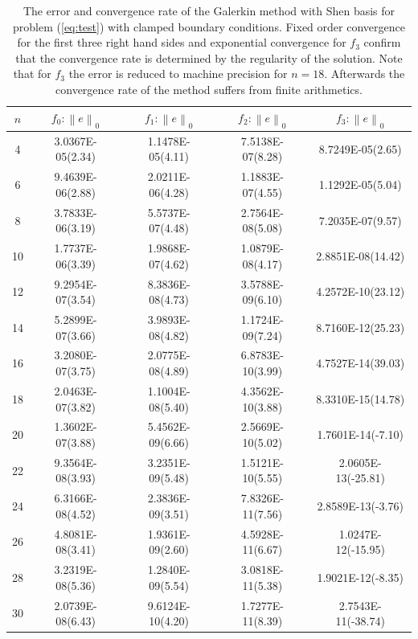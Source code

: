 \documentclass{marine_2015}
\newcommand{\norm}[1]{\ensuremath{\left\|#1\right\|}}
\begin{document}
\begin{table}[t!]
    \begin{center}
    \begin{tabular}{ccccc}
\hline
$n$  &  $f_0: \norm{e}_0$  & $f_1: \norm{e}_0$ & $f_2: \norm{e}_0$ & $f_3: \norm{e}_0$\\
\hline
4 &  3.0367E-05(2.34)& 1.1478E-05(4.11)& 7.5138E-07(8.28)& 8.7249E-05(2.65)  \\ 
6 &  9.4639E-06(2.88)& 2.0211E-06(4.28)& 1.1883E-07(4.55)& 1.1292E-05(5.04) \\
8 &  3.7833E-06(3.19)& 5.5737E-07(4.48)& 2.7564E-08(5.08)& 7.2035E-07(9.57) \\
10&  1.7737E-06(3.39)& 1.9868E-07(4.62)& 1.0879E-08(4.17)& 2.8851E-08(14.42) \\
12&  9.2954E-07(3.54)& 8.3836E-08(4.73)& 3.5788E-09(6.10)& 4.2572E-10(23.12) \\
14&  5.2899E-07(3.66)& 3.9893E-08(4.82)& 1.1724E-09(7.24)& 8.7160E-12(25.23) \\
16&  3.2080E-07(3.75)& 2.0775E-08(4.89)& 6.8783E-10(3.99)& 4.7527E-14(39.03) \\
18&  2.0463E-07(3.82)& 1.1004E-08(5.40)& 4.3562E-10(3.88)& 8.3310E-15(14.78) \\
20&  1.3602E-07(3.88)& 5.4562E-09(6.66)& 2.5669E-10(5.02)& 1.7601E-14(-7.10) \\
22&  9.3564E-08(3.93)& 3.2351E-09(5.48)& 1.5121E-10(5.55)& 2.0605E-13(-25.81)\\
24&  6.3166E-08(4.52)& 2.3836E-09(3.51)& 7.8326E-11(7.56)& 2.8589E-13(-3.76) \\
26&  4.8081E-08(3.41)& 1.9361E-09(2.60)& 4.5928E-11(6.67)& 1.0247E-12(-15.95)\\
28&  3.2319E-08(5.36)& 1.2840E-09(5.54)& 3.0818E-11(5.38)& 1.9021E-12(-8.35) \\
30&  2.0739E-08(6.43)& 9.6124E-10(4.20)& 1.7277E-11(8.39)& 2.7543E-11(-38.74)\\
\hline
    \end{tabular}
    \caption{
    The error and convergence rate of the Galerkin method with Shen basis for
    problem (\ref{eq:test}) with clamped boundary conditions. Fixed order
    convergence for the first three right hand sides and exponential convergence
    for $f_3$ confirm that the convergence rate is determined by the regularity of 
    the solution. Note that for $f_3$ the error is reduced to machine precision
    for $n=18$. Afterwards the convergence rate of the method suffers from
    finite arithmetics.}
  \label{tab:shen_convergence}
  \end{center}
  \end{table}
\end{document}
